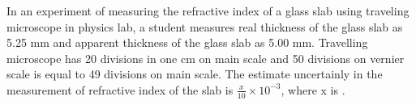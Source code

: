 \item In an experiment of measuring the refractive index of a glass slab using traveling microscope in physics lab, a student measures real thickness of the glass slab as 5.25 mm and apparent thickness of the glass slab as 5.00 mm. Travelling microscope has 20 divisions in one cm on main scale and 50 divisions on vernier scale is equal to 49 divisions on main scale. The estimate uncertainly in the measurement of refractive index of the slab is $\frac{x}{10} \times 10^{-3}$, where x is \underline{\hspace{2.5cm}}.